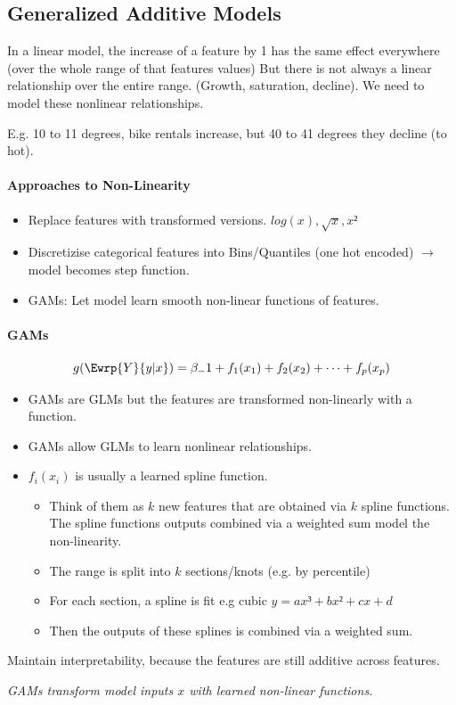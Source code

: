 \subsection{Generalized Additive Models}
In a linear model, the increase of a feature by 1 has the same effect everywhere (over the whole range of that features values)
But there is not always a linear relationship over the entire range. (Growth, saturation, decline). We need to model these nonlinear relationships.

E.g. 10 to 11 degrees, bike rentals increase, but 40 to 41 degrees they decline (to hot).
\paragraph{Approaches to Non-Linearity}
\begin{itemize}
	\item Replace features with transformed versions. $log(x), \sqrt{x}, x²$
	\item Discretizise categorical features into Bins/Quantiles (one hot encoded) $\to$ model becomes step function.
	\item GAMs: Let model learn smooth non-linear functions of features.
\end{itemize}

\paragraph{GAMs}
\begin{equation}
	g(\Ewrp{Y}{y|x}) = \beta_-1 + f_1(x_1) + f_2(x_2) + \dots + f_p(x_p)
	\label{eq:GAM}
\end{equation}
\begin{itemize}
	\item GAMs are GLMs but the features are transformed non-linearly with a function.
	\item GAMs allow GLMs to learn nonlinear relationships.
	\item $f_i(x_i)$ is usually a learned spline function.
	      \begin{itemize}
		      \item Think of them as $k$ new features that are obtained via $k$ spline functions. The spline functions outputs combined via a weighted sum model the non-linearity.
		      \item The range is split into $k$ sections/knots (e.g. by percentile)
		      \item For each section, a spline is fit e.g cubic $y = ax³ + bx² + cx + d$
		      \item Then the outputs of these splines is combined via a weighted sum.
	      \end{itemize}
\end{itemize}

Maintain interpretability, because the features are still additive across features.


\textit{GAMs transform model inputs $x$ with learned non-linear functions.}


